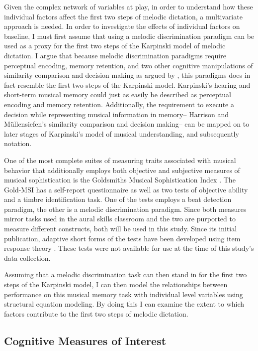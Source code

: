 \documentclass[12pt,]{book}
\begin{document}
Given the complex network of variables at play, in order to understand how these individual factors affect the first two steps of melodic dictation, a multivariate approach is needed.
In order to investigate the effects of individual factors on baseline, I must first assume that using a melodic discrimination paradigm can be used as a proxy for the first two steps of the Karpinski model of melodic dictation.
I argue that because melodic discrimination paradigms require perceptual encoding, memory retention, and two other cognitive manipulations of similarity comparison and decision making as argued by \citet{harrisonModellingMelodicDiscrimination2016}, this paradigms does in fact resemble the first two steps of the Karpinski model.
Karpinski's hearing and short-term musical memory could just as easily be described as perceptual encoding and memory retention.
Additionally, the requirement to execute a decision while representing musical information in memory-- Harrison and Müllensiefen's similarity comparison and decision making-- can be mapped on to later stages of Karpinski's model of musical understanding, and subsequently notation.

One of the most complete suites of measuring traits associated with musical behavior that additionally employs both objective and subjective measures of musical sophistication is the Goldsmiths Musical Sophistication Index \citep{mullensiefenMusicalityNonMusiciansIndex2014}.
The Gold-MSI has a self-report questionnaire as well as two tests of objective ability and a timbre identification task.
One of the tests employs a beat detection paradigm, the other is a melodic discrimination paradigm.
Since both measures mirror tasks used in the aural skills classroom and the two are purported to measure different constructs, both will be used in this study.
Since its initial publication, adaptive short forms of the tests have been developed using item response theory \citep{harrisonApplyingModernPsychometric2017a}.
These tests were not available for use at the time of this study's data collection.

Assuming that a melodic discrimination task can then stand in for the first two steps of the Karpinski model, I can then model the relationships between performance on this musical memory task with individual level variables using structural equation modeling.
By doing this I can examine the extent to which factors contribute to the first two steps of melodic dictation.

\hypertarget{cognitive-measures-of-interest}{%
\subsection{Cognitive Measures of Interest}\label{cognitive-measures-of-interest}}
\end{document}
